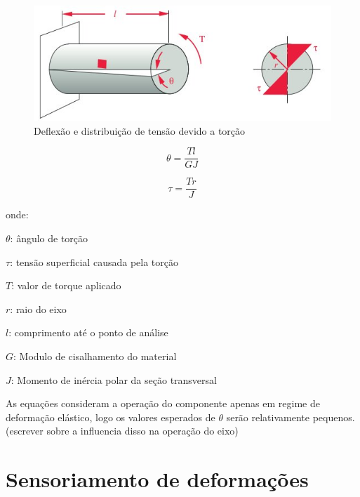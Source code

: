 \begin{figure}[htb]
	\caption{\label{fig:Fig_501}Deflexão e distribuição de tensão devido a torção}
	\begin{center}
		\includegraphics[width=\textwidth]{images/img501.jpg}
	\end{center}
\end{figure}

\begin{equation}\label{eq:Eq_505}
\theta = \frac{Tl}{GJ}
\end{equation}

\begin{equation}\label{eq:Eq_506}
\tau = \frac{Tr}{J}
\end{equation}

onde:

$\theta$: ângulo de torção

$\tau$: tensão superficial causada pela torção

$T$: valor de torque aplicado

$r$: raio do eixo

$l$: comprimento até o ponto de análise

$G$: Modulo de cisalhamento do material

$J$: Momento de inércia polar da seção transversal

\vspace{\baselineskip}

As equações consideram a operação do componente apenas em regime de deformação elástico, logo os valores esperados de $\theta$ serão relativamente pequenos. (escrever sobre a influencia disso na operação do eixo)

\vspace{\baselineskip}

\section{Sensoriamento de deformações}


